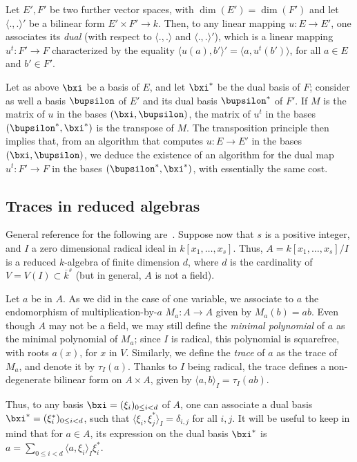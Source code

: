 \documentclass{sig-alternate}
\newcounter{algo}
\newcommand{\ang}[1]{\langle#1\rangle}
\begin{document}
Let $E',F'$ be two further vector spaces, with $\dim(E')=\dim(F')$ and
let $\ang{.,.}'$ be a bilinear form $E'\times F' \to k$. Then, to
any linear mapping $u:E\to E'$, one associates its {\em dual}
(with respect to $\ang{.,.}$ and $\ang{.,.}'$), which is a linear
mapping $u^t: F' \to F$ characterized by the equality
$\ang{u(a),b'}'=\ang{a,u^t(b')}$, for all $a\in E$ and $b'\in F'$.

Let as above $\bxi$ be a basis of $E$, and let $\bxi^\ast$ be
the dual basis of $F$; consider as well a basis $\bupsilon$ of $E'$ and
its dual basis $\bupsilon^\ast$ of $F'$. If $M$ is the matrix of $u$ in
the bases $(\bxi,\bupsilon)$, the matrix of $u^t$ in the bases
$(\bupsilon^\ast,\bxi^\ast)$ is the transpose of $M$. The
transposition principle then implies that, from an algorithm that
computes $u: E \to E'$ in the bases $(\bxi,\bupsilon)$, we deduce the
existence of an algorithm for the dual map $u^t: F' \to F$ in the
bases $(\bupsilon^\ast,\bxi^\ast)$, with essentially the same cost.


\subsection{Traces in reduced algebras}

General reference for the following
are~\cite{Kunz86,Cox-Little-OShea:UAG2005}. Suppose now that $s$ is a
positive integer, and $I$ a zero dimensional radical ideal in
$k[x_1,\dots,x_s]$. Thus, $A=k[x_1,\dots,x_s]/I$ is a reduced
$k$-algebra of finite dimension $d$, where $d$ is the cardinality of
$V=V(I) \subset\overline{k}^s$ (but in general, $A$ is not a field).

Let $a$ be in $A$. As we did in the case of one variable, we associate
to $a$ the endomorphism of multiplication-by-$a$ $M_a: A \to A$ given
by $M_a(b)=ab$.  Even though $A$ may not be a field, we may still
define the {\em minimal polynomial} of $a$ as the minimal polynomial
of $M_a$; since $I$ is radical, this polynomial is squarefree, with
roots $a(x)$, for $x$ in $V$. Similarly, we define the \emph{trace} of
$a$ as the trace of $M_a$, and denote it by $\tau_I(a)$. Thanks to $I$
being radical, the trace defines a non-degenerate bilinear form on
$A\times A$, given by $\ang{a,b}_I = \tau_I(ab)$.

Thus, to any basis $\bxi=(\xi_i)_{0 \le i < d}$ of $A$, one can
associate a dual basis $\bxi^\ast=(\xi^\ast_i)_{0 \le i < d}$,
such that $\ang{\xi_i, \xi^\ast_j}_I=\delta_{i,j}$ for all
$i,j$.  It will be useful to keep in mind that for $a \in A$, its
expression on the dual basis $\bxi^\ast$ is $a=\sum_{0 \le i < d}
\ang{a,\xi_i}_I \xi^\ast_i$.
\end{document}
